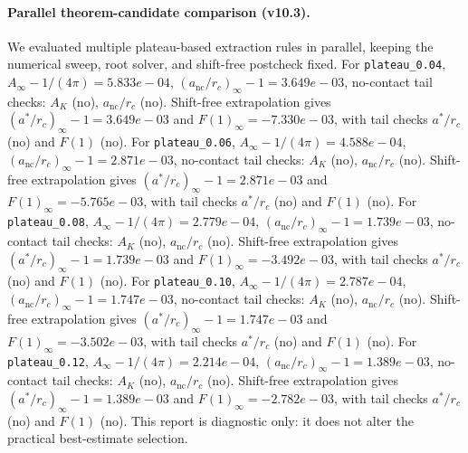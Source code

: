 \paragraph{Parallel theorem-candidate comparison (v10.3).}
We evaluated multiple plateau-based extraction rules in parallel, keeping the numerical sweep, root solver, and shift-free postcheck fixed. For \texttt{plateau_0.04}, $A_\infty-1/(4\pi)=5.833e-04$, $(a_{\mathrm{nc}}/r_c)_\infty-1=3.649e-03$, no-contact tail checks: $A_K$ (no), $a_{\mathrm{nc}}/r_c$ (no). Shift-free extrapolation gives $(a^*/r_c)_\infty-1=3.649e-03$ and $F(1)_\infty=-7.330e-03$, with tail checks $a^*/r_c$ (no) and $F(1)$ (no). For \texttt{plateau_0.06}, $A_\infty-1/(4\pi)=4.588e-04$, $(a_{\mathrm{nc}}/r_c)_\infty-1=2.871e-03$, no-contact tail checks: $A_K$ (no), $a_{\mathrm{nc}}/r_c$ (no). Shift-free extrapolation gives $(a^*/r_c)_\infty-1=2.871e-03$ and $F(1)_\infty=-5.765e-03$, with tail checks $a^*/r_c$ (no) and $F(1)$ (no). For \texttt{plateau_0.08}, $A_\infty-1/(4\pi)=2.779e-04$, $(a_{\mathrm{nc}}/r_c)_\infty-1=1.739e-03$, no-contact tail checks: $A_K$ (no), $a_{\mathrm{nc}}/r_c$ (no). Shift-free extrapolation gives $(a^*/r_c)_\infty-1=1.739e-03$ and $F(1)_\infty=-3.492e-03$, with tail checks $a^*/r_c$ (no) and $F(1)$ (no). For \texttt{plateau_0.10}, $A_\infty-1/(4\pi)=2.787e-04$, $(a_{\mathrm{nc}}/r_c)_\infty-1=1.747e-03$, no-contact tail checks: $A_K$ (no), $a_{\mathrm{nc}}/r_c$ (no). Shift-free extrapolation gives $(a^*/r_c)_\infty-1=1.747e-03$ and $F(1)_\infty=-3.502e-03$, with tail checks $a^*/r_c$ (no) and $F(1)$ (no). For \texttt{plateau_0.12}, $A_\infty-1/(4\pi)=2.214e-04$, $(a_{\mathrm{nc}}/r_c)_\infty-1=1.389e-03$, no-contact tail checks: $A_K$ (no), $a_{\mathrm{nc}}/r_c$ (no). Shift-free extrapolation gives $(a^*/r_c)_\infty-1=1.389e-03$ and $F(1)_\infty=-2.782e-03$, with tail checks $a^*/r_c$ (no) and $F(1)$ (no). This report is diagnostic only: it does not alter the practical best-estimate selection.
